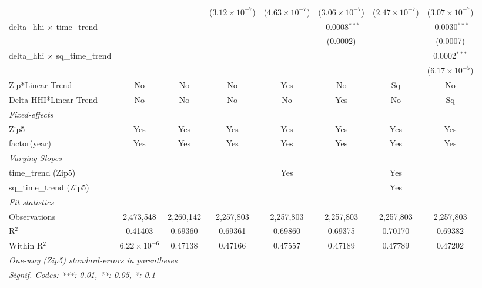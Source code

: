 \begin{table}[H]
{\begin{tabular}{lccccccc}
   &   &    & ($3.12\times 10^{-7}$) & ($4.63\times 10^{-7}$) & ($3.06\times 10^{-7}$) & ($2.47\times 10^{-7}$) & ($3.07\times 10^{-7}$)\\ 

 delta\_hhi $\times $ time\_trend&   &    &    &    & -0.0008$^{***}$ &    & -0.0030$^{***}$\\ 

   &   &    &    &    & (0.0002) &    & (0.0007)\\ 

 delta\_hhi $\times $ sq\_time\_trend&   &    &    &    &    &    & 0.0002$^{***}$\\ 

   &   &    &    &    &    &    & ($6.17\times 10^{-5}$)\\ 

 Zip*Linear Trend & No & No & No & Yes & No & Sq & No\\ 

 Delta HHI*Linear Trend & No & No & No & No & Yes & No & Sq\\ 

 \midrule \emph{Fixed-effects}&   &   &   &   &   &   &  \\ 

 Zip5 & Yes & Yes & Yes & Yes & Yes & Yes & Yes\\ 

 factor(year) & Yes & Yes & Yes & Yes & Yes & Yes & Yes\\ 

 \midrule \emph{Varying Slopes}&   &   &   &   &   &   &  \\ 

 time\_trend (Zip5) &  &  &  & Yes &  & Yes & \\ 

 sq\_time\_trend (Zip5) &  &  &  &  &  & Yes & \\ 

 \midrule \emph{Fit statistics}&  & & & & & & \\ 

 Observations & 2,473,548&2,260,142&2,257,803&2,257,803&2,257,803&2,257,803&2,257,803\\ 

 R$^2$ & 0.41403&0.69360&0.69361&0.69860&0.69375&0.70170&0.69382\\ 

 Within R$^2$ & $6.22\times 10^{-6}$&0.47138&0.47166&0.47557&0.47189&0.47789&0.47202\\ 

 \midrule\midrule\multicolumn{8}{l}{\emph{One-way (Zip5) standard-errors in parentheses}}\\ 

 \multicolumn{8}{l}{\emph{Signif. Codes: ***: 0.01, **: 0.05, *: 0.1}}\\ 

 \end{tabular}} 

 \end{table} 

